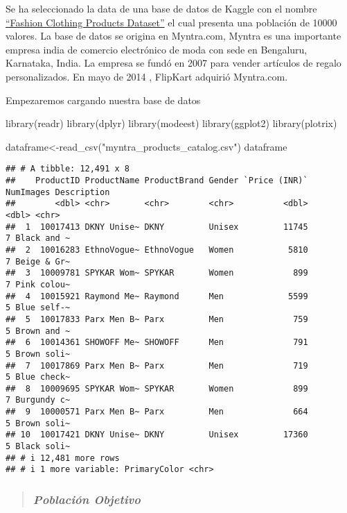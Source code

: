 \documentclass[
]{article}
\newenvironment{Shaded}{\begin{snugshade}}{\end{snugshade}}
\newcommand{\FunctionTok}[1]{\textcolor[rgb]{0.00,0.00,0.00}{#1}}
\newcommand{\NormalTok}[1]{#1}
\newcommand{\OtherTok}[1]{\textcolor[rgb]{0.56,0.35,0.01}{#1}}
\newcommand{\StringTok}[1]{\textcolor[rgb]{0.31,0.60,0.02}{#1}}
\begin{document}
Se ha seleccionado la data de una base de datos de Kaggle con el nombre
\href{BaseDatos}{``Fashion Clothing Products Dataset''} el cual presenta
una población de 10000 valores. La base de datos se origina en
Myntra.com, Myntra es una importante empresa india de comercio
electrónico de moda con sede en Bengaluru, Karnataka, India. La empresa
se fundó en 2007 para vender artículos de regalo personalizados. En mayo
de 2014 , FlipKart adquirió Myntra.com.

Empezaremos cargando nuestra base de datos

\begin{Shaded}
\begin{Highlighting}[]
\FunctionTok{library}\NormalTok{(readr)}
\FunctionTok{library}\NormalTok{(dplyr)}
\FunctionTok{library}\NormalTok{(modeest)}
\FunctionTok{library}\NormalTok{(ggplot2)}
\FunctionTok{library}\NormalTok{(plotrix)}

\NormalTok{dataframe}\OtherTok{\textless{}{-}}\FunctionTok{read\_csv}\NormalTok{(}\StringTok{"myntra\_products\_catalog.csv"}\NormalTok{)}
\NormalTok{dataframe}
\end{Highlighting}
\end{Shaded}

\begin{verbatim}
## # A tibble: 12,491 x 8
##    ProductID ProductName ProductBrand Gender `Price (INR)` NumImages Description
##        <dbl> <chr>       <chr>        <chr>          <dbl>     <dbl> <chr>      
##  1  10017413 DKNY Unise~ DKNY         Unisex         11745         7 Black and ~
##  2  10016283 EthnoVogue~ EthnoVogue   Women           5810         7 Beige & Gr~
##  3  10009781 SPYKAR Wom~ SPYKAR       Women            899         7 Pink colou~
##  4  10015921 Raymond Me~ Raymond      Men             5599         5 Blue self-~
##  5  10017833 Parx Men B~ Parx         Men              759         5 Brown and ~
##  6  10014361 SHOWOFF Me~ SHOWOFF      Men              791         5 Brown soli~
##  7  10017869 Parx Men B~ Parx         Men              719         5 Blue check~
##  8  10009695 SPYKAR Wom~ SPYKAR       Women            899         7 Burgundy c~
##  9  10000571 Parx Men B~ Parx         Men              664         5 Brown soli~
## 10  10017421 DKNY Unise~ DKNY         Unisex         17360         5 Black soli~
## # i 12,481 more rows
## # i 1 more variable: PrimaryColor <chr>
\end{verbatim}

\begin{quote}
\hypertarget{poblaciuxf3n-objetivo}{%
\subsubsection{\texorpdfstring{\textbf{\emph{Población
Objetivo}}}{Población Objetivo}}\label{poblaciuxf3n-objetivo}}
\end{quote}
\end{document}
